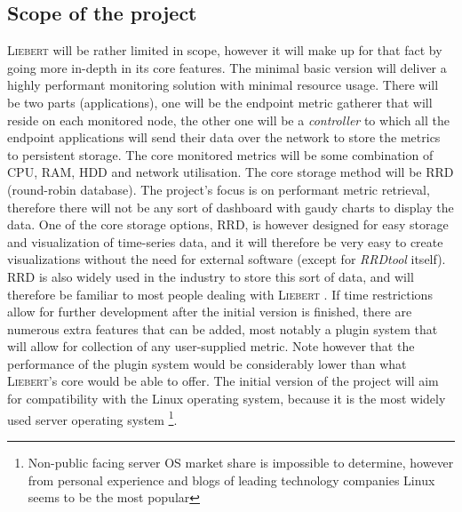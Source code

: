     \subsection{Scope of the project}\label{sec:scope}
        \textsc{Liebert} will be rather limited in scope, however it will make up for that fact by going more in-depth in its core features. The minimal basic version will deliver a highly performant monitoring solution with minimal resource usage. There will be two parts (applications), one will be the endpoint metric gatherer that will reside on each monitored node, the other one will be a \textit{controller} to which all the endpoint applications will send their data over the network to store the metrics to persistent storage. The core monitored metrics will be some combination of CPU, RAM, HDD and network utilisation. The core storage method will be RRD (round-robin database). The project's focus is on performant metric retrieval, therefore there will not be any sort of dashboard with gaudy charts to display the data. One of the core storage options, RRD, is however designed for easy storage and visualization of time-series data, and it will therefore be very easy to create visualizations without the need for external software (except for \textit{RRDtool} itself). RRD is also widely used in the industry to store this sort of data, and will therefore be familiar to most people dealing with \textsc{Liebert} \citep{rrdtool}. If time restrictions allow for further development after the initial version is finished, there are numerous extra features that can be added, most notably a plugin system that will allow for collection of any user-supplied metric. Note however that the performance of the plugin system would be considerably lower than what \textsc{Liebert}'s core would be able to offer. The initial version of the project will aim for compatibility with the Linux operating system, because it is the most widely used server operating system \citep{systempop}\footnote{Non-public facing server OS market share is impossible to determine, however from personal experience and blogs of leading technology companies Linux seems to be the most popular}.